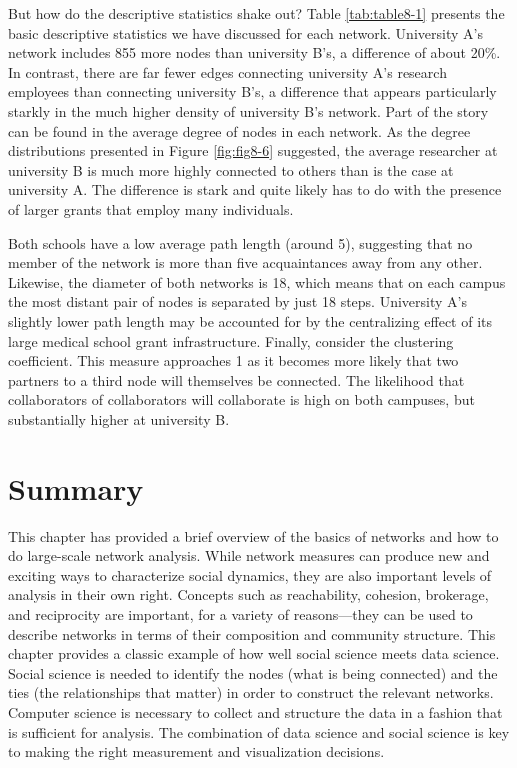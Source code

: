 \documentclass[]{krantz}
\begin{document}
But how do the descriptive statistics shake out? Table
\ref{tab:table8-1} presents the basic descriptive statistics we have
discussed for each network. University A's network includes 855 more
nodes than university B's, a difference of about 20\%. In contrast,
there are far fewer edges connecting university A's research employees
than connecting university B's, a difference that appears particularly
starkly in the much higher density of university B's network. Part of
the story can be found in the average degree of nodes in each network.
As the degree distributions presented in Figure \ref{fig:fig8-6}
suggested, the average researcher at university B is much more highly
connected to others than is the case at university A. The difference is
stark and quite likely has to do with the presence of larger grants that
employ many individuals.

Both schools have a low average path length (around 5), suggesting that
no member of the network is more than five acquaintances away from any
other. Likewise, the diameter of both networks is 18, which means that
on each campus the most distant pair of nodes is separated by just 18
steps. University A's slightly lower path length may be accounted for by
the centralizing effect of its large medical school grant
infrastructure. Finally, consider the clustering coefficient. This
measure approaches 1 as it becomes more likely that two partners to a
third node will themselves be connected. The likelihood that
collaborators of collaborators will collaborate is high on both
campuses, but substantially higher at university B.

\section{Summary}\label{summary-6}

This chapter has provided a brief overview of the basics of networks and
how to do large-scale network analysis. While network measures can
produce new and exciting ways to characterize social dynamics, they are
also important levels of analysis in their own right. Concepts such as
reachability, cohesion, brokerage, and reciprocity are important, for a
variety of reasons---they can be used to describe networks in terms of
their composition and community structure. This chapter provides a
classic example of how well social science meets data science. Social
science is needed to identify the nodes (what is being connected) and
the ties (the relationships that matter) in order to construct the
relevant networks. Computer science is necessary to collect and
structure the data in a fashion that is sufficient for analysis. The
combination of data science and social science is key to making the
right measurement and visualization decisions.
\end{document}
